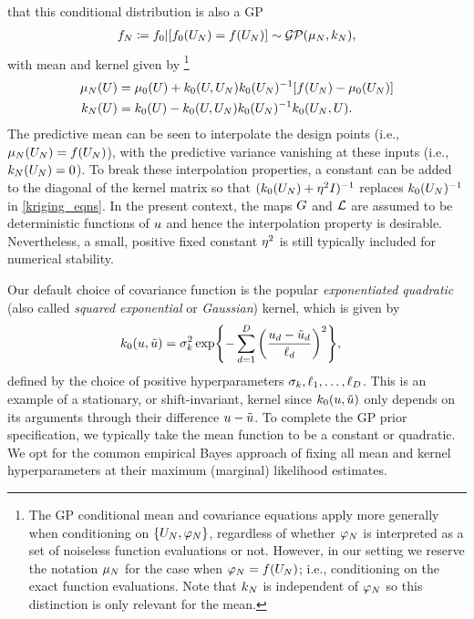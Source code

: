 \documentclass[12pt]{article}
\begin{document}
\cite{gpML} that this conditional distribution is also a GP
\begin{align}
\funcEm[\Ndesign] \Def \funcPrior|[\funcPrior(\designIn)=\func(\designIn)]\sim \GP(\gpMean[\Ndesign], \gpKer[\Ndesign]), \label{generic_gp_conditional}
\end{align}
with mean and kernel given by
\footnote{The GP conditional mean and covariance equations apply more generally when conditioning on 
$\{\designIn[\Ndesign], \funcVal[\Ndesign]\}$, regardless of whether $\funcVal[\Ndesign]$ is interpreted as 
a set of noiseless function evaluations or not. However, in our setting we reserve the notation $\gpMean[\Ndesign]$
for the case when $\funcVal[\Ndesign] = \func(\designIn[\Ndesign])$; i.e., conditioning on the exact function 
evaluations. Note that $\gpKer[\Ndesign]$ is independent of $\funcVal[\Ndesign]$ so this distinction is only 
relevant for the mean.} 
\begin{align}
\gpMean[\Ndesign](\parMat) &= \gpMeanPrior(\parMat) + \gpKerPrior(\parMat, \designIn) \gpKerPrior(\designIn)^{-1} [\func(\designIn) - \gpMeanPrior(\designIn)] \label{kriging_eqns} \\
\gpKer[\Ndesign](\parMat) &= \gpKerPrior(\parMat) - \gpKerPrior(\parMat, \designIn) \gpKerPrior(\designIn)^{-1} \gpKerPrior(\designIn, \parMat). \nonumber
\end{align}
The predictive mean can be seen to interpolate the design points (i.e., $\gpMean[\Ndesign](\designIn) = \func(\designIn[\Ndesign])$), with 
the predictive variance vanishing at these inputs (i.e., $\gpKer[\Ndesign](\designIn) = 0$). To break these interpolation properties,
a constant can be added to the diagonal of the kernel matrix so that $(\gpKerPrior(\designIn) + \nuggetSD^2 I)^{-1}$ replaces 
$\gpKerPrior(\designIn)^{-1}$ in \ref{kriging_eqns}. In the present context, the maps $\fwd$ and $\llik$ are assumed to be deterministic functions 
of $\Par$ and hence the interpolation property is desirable. Nevertheless, a small, positive fixed constant $\nuggetSD^2$ is still 
typically included for numerical stability. 

Our default choice of covariance function is the popular \textit{exponentiated quadratic} 
(also called \textit{squared exponential} or \textit{Gaussian}) kernel, which is given by 
\begin{align}
\gpKerPrior(\Par, \tilde{\Par}) &= 
\margSD^2 \Exp{- \sum_{\idxParDim=1}^{\dimPar} \left(\frac{\Par_{\idxParDim} - \tilde{\Par}_{\idxParDim}}{\lengthscale_{\idxParDim}} \right)^2}, 
\end{align}
defined by the choice of positive hyperparameters $\margSD, \lengthscale_{1}, \dots, \lengthscale_{\dimPar}$. This is an example
of a stationary, or shift-invariant, kernel since $\gpKerPrior(\Par, \tilde{\Par})$ only depends on its arguments through their difference 
$\Par - \tilde{\Par}$. To complete the GP prior specification, we typically take the mean 
function to be a constant or quadratic. We opt for the common empirical Bayes approach of fixing all mean and kernel hyperparameters 
at their maximum (marginal) likelihood estimates.
\end{document}
